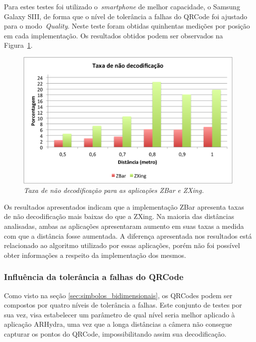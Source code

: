 	Para estes testes foi utilizado o~\textit{smartphone} de melhor capacidade, o Samsung Galaxy SIII, de forma que o 
	nível de tolerância a falhas do QRCode foi ajustado para o modo~\textit{Quality}. Neste teste 
	foram obtidas quinhentas medições por posição em cada implementação. Os resultados obtidos podem ser observados na 
	Figura~\ref{fig:testeSuporte}.
	
	\begin{figure}[htb] 
		\centering \includegraphics[scale=0.75]{figuras/cap4/grafico_suporte.png}
		\caption{\textit{Taxa de não decodificação para as aplicações ZBar e ZXing.}}
		\label{fig:testeSuporte} 
	\end{figure}
	
	Os resultados apresentados indicam que a implementação ZBar apresenta taxas de não decodificação mais baixas do 
	que a ZXing. Na maioria das distâncias analisadas, ambas as aplicações apresentaram aumento em suas taxas a 
	medida com que a distância fosse aumentada. A diferença apresentada nos resultados está relacionado ao algoritmo 
	utilizado por essas aplicações, porém não foi possível obter informações a respeito da implementação dos mesmos.
	
	
\subsubsection{Influência da tolerância a falhas do QRCode}

	
	Como visto na seção \ref{sec:simbolos_bidimensionais}, os QRCodes podem ser compostos por quatro níveis de 
	tolerância a falhas. Este conjunto de testes por sua vez, visa estabelecer um parâmetro de qual nível seria 
	melhor aplicado à aplicação ARHydra, uma vez que a longa distâncias a câmera não consegue capturar os pontos 
	do QRCode, impossibilitando	assim sua decodificação. 
	
